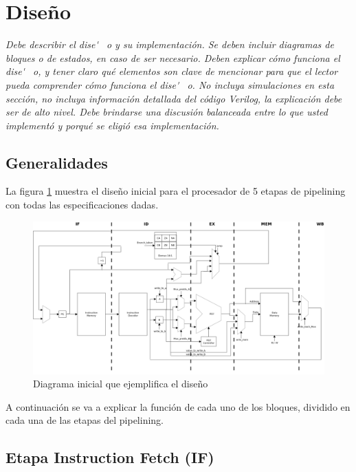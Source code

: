 \newpage
\section{Dise\~ no}
\textit{Debe describir el dise\' ~o y su implementaci\' on. Se deben incluir diagramas de bloques o de estados, en caso de ser necesario. Deben explicar c\' omo funciona el dise\' ~o, y tener claro qu\' e elementos son clave de mencionar para que el lector pueda comprender c\' omo funciona el dise\' ~o. No incluya simulaciones en esta secci\' on, no incluya informaci\' on detallada del c\' odigo Verilog, la explicaci\' on debe ser de alto nivel. Debe brindarse una discusi\' on balanceada entre lo que usted implement\' o y porqu\' e se eligi\' o esa implementaci\' on. }

\subsection{Generalidades}


La figura \ref{fig:DiagramaInicial} muestra el diseño inicial para el procesador de 5 etapas de pipelining con todas las especificaciones dadas.

\begin{figure}[H]
	\centering
		\includegraphics[width=\textwidth]{./imagenes/DiagramaInicial}
	\caption{Diagrama inicial que ejemplifica el diseño}
	\label{fig:DiagramaInicial}
\end{figure}

A continuación se va a explicar la función de cada uno de los bloques, dividido en cada una de las etapas del pipelining.

\subsection{Etapa Instruction Fetch (IF)}

